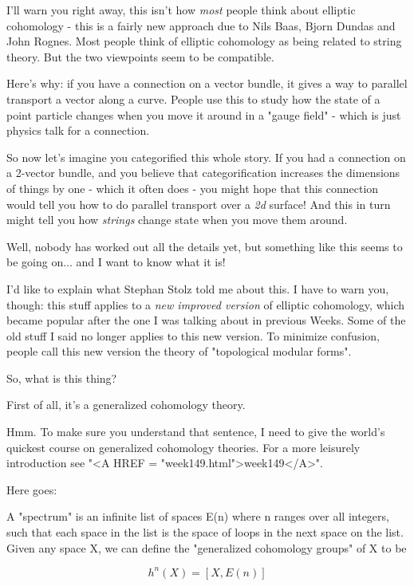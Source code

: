 I'll warn you right away, this isn't how \emph{most} people think 
about elliptic cohomology - this is a fairly new approach due to 
Nils Baas, Bjorn Dundas and John Rognes.  Most people think of 
elliptic cohomology as being related to string theory.  But the 
two viewpoints seem to be compatible.

Here's why: if you have a connection on a vector bundle, it gives 
a way to parallel transport a vector along a curve.  People use this 
to study how the state of a point particle changes when you move it 
around in a "gauge field" - which is just physics talk for 
a connection.

So now let's imagine you categorified this whole story.  If you 
had a connection on a 2-vector bundle, and you believe that 
categorification increases the dimensions of things by one -
which it often does - you might hope that this connection would 
tell you how to do parallel transport over a \emph{2d} surface!  And 
this in turn might tell you how \emph{strings} change state when you 
move them around.

Well, nobody has worked out all the details yet, but something like
this seems to be going on... and I want to know what it is!

I'd like to explain what Stephan Stolz told me about this.  I have 
to warn you, though: this stuff applies to a \emph{new improved version}
of elliptic cohomology, which became popular after the one I was 
talking about in previous Weeks.  
Some of the old stuff I said no longer applies to 
this new version.  To minimize confusion, people call this new 
version the theory of "topological modular forms".   

So, what is this thing?

First of all, it's a generalized cohomology theory.  

Hmm.  To make sure you understand that sentence, I need to give
the world's quickest course on generalized cohomology theories.  
For a more leisurely introduction see 
"<A HREF = "week149.html">week149</A>".

Here goes: 

A "spectrum" is an infinite list of spaces E(n) where n ranges over 
all integers, such that each space in the list is the space of 
loops in the next space on the list.  Given any space X, we can 
define the "generalized cohomology groups" of X to be 


$$

h^{n}(X) = [X,E(n)]
$$
    
